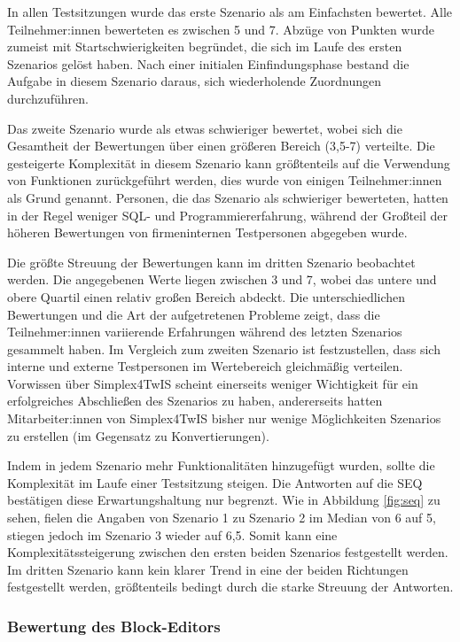 In allen Testsitzungen wurde das erste Szenario als am Einfachsten bewertet. Alle Teilnehmer:innen bewerteten es zwischen 5 und 7. Abzüge von Punkten wurde zumeist mit Startschwierigkeiten begründet, die sich im Laufe des ersten Szenarios gelöst haben. Nach einer initialen Einfindungsphase bestand die Aufgabe in diesem Szenario daraus, sich wiederholende Zuordnungen durchzuführen.

Das zweite Szenario wurde als etwas schwieriger bewertet, wobei sich die Gesamtheit der Bewertungen über einen größeren Bereich (3,5-7) verteilte. Die gesteigerte Komplexität in diesem Szenario kann  größtenteils auf die Verwendung von Funktionen zurückgeführt werden, dies wurde von einigen Teilnehmer:innen als Grund genannt. Personen, die das Szenario als schwieriger bewerteten, hatten in der Regel weniger \ac{SQL}- und Programmiererfahrung, während der Großteil der höheren Bewertungen von firmeninternen Testpersonen abgegeben wurde.

Die größte Streuung der Bewertungen kann im dritten Szenario beobachtet werden. Die angegebenen Werte liegen zwischen 3 und 7, wobei das untere und obere Quartil einen relativ großen Bereich abdeckt. Die unterschiedlichen Bewertungen und die Art der aufgetretenen Probleme zeigt, dass die Teilnehmer:innen variierende Erfahrungen während des letzten Szenarios gesammelt haben. Im Vergleich zum zweiten Szenario ist festzustellen, dass sich interne und externe Testpersonen im Wertebereich gleichmäßig verteilen. Vorwissen über Simplex4TwIS scheint einerseits weniger Wichtigkeit für ein erfolgreiches Abschließen des Szenarios zu haben, andererseits hatten Mitarbeiter:innen von Simplex4TwIS bisher nur wenige Möglichkeiten Szenarios zu erstellen (im Gegensatz zu Konvertierungen).

Indem in jedem Szenario mehr Funktionalitäten hinzugefügt wurden, sollte die Komplexität im Laufe einer Testsitzung steigen. Die Antworten auf die \ac{SEQ} bestätigen diese Erwartungshaltung nur begrenzt. Wie in Abbildung \ref{fig:seq} zu sehen, fielen die Angaben von Szenario 1 zu Szenario 2 im Median von 6 auf 5, stiegen jedoch im Szenario 3 wieder auf 6,5. Somit kann eine Komplexitätssteigerung zwischen den ersten beiden Szenarios festgestellt werden. Im dritten Szenario kann kein klarer Trend in eine der beiden Richtungen festgestellt werden, größtenteils bedingt durch die starke Streuung der Antworten.

\subsubsection{Bewertung des Block-Editors}

